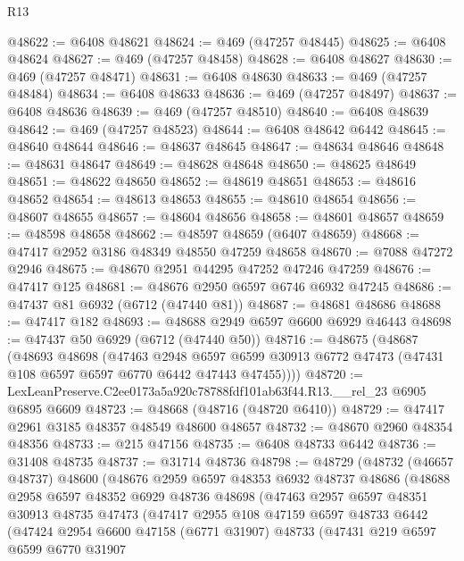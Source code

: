 \begin{lexlean}{R13}
\begin{coremodule}
@48622 := @6408 @48621
@48624 := @469 (@47257 @48445)
@48625 := @6408 @48624
@48627 := @469 (@47257 @48458)
@48628 := @6408 @48627
@48630 := @469 (@47257 @48471)
@48631 := @6408 @48630
@48633 := @469 (@47257 @48484)
@48634 := @6408 @48633
@48636 := @469 (@47257 @48497)
@48637 := @6408 @48636
@48639 := @469 (@47257 @48510)
@48640 := @6408 @48639
@48642 := @469 (@47257 @48523)
@48644 := @6408 @48642 @6442
@48645 := @48640 @48644
@48646 := @48637 @48645
@48647 := @48634 @48646
@48648 := @48631 @48647
@48649 := @48628 @48648
@48650 := @48625 @48649
@48651 := @48622 @48650
@48652 := @48619 @48651
@48653 := @48616 @48652
@48654 := @48613 @48653
@48655 := @48610 @48654
@48656 := @48607 @48655
@48657 := @48604 @48656
@48658 := @48601 @48657
@48659 := @48598 @48658
@48662 := @48597 @48659 (@6407 @48659)
@48668 := @47417 @2952 @3186 @48349 @48550 @47259 @48658
@48670 := @7088 @47272 @2946
@48675 := @48670 @2951 @44295 @47252 @47246 @47259
@48676 := @47417 @125
@48681 := @48676 @2950 @6597 @6746 @6932 @47245
@48686 := @47437 @81 @6932 (@6712 (@47440 @81))
@48687 := @48681 @48686
@48688 := @47417 @182
@48693 := @48688 @2949 @6597 @6600 @6929 @46443
@48698 := @47437 @50 @6929 (@6712 (@47440 @50))
@48716 := @48675
    (@48687
      (@48693
        @48698
        (@47463
          @2948
          @6597
          @6599
          @30913
          @6772
          @47473
          (@47431 @108 @6597 @6597 @6770 @6442 @47443 @47455))))
@48720 := LexLeanPreserve.C2ee0173a5a920c78788fdf101ab63f44.R13.__rel_23 @6905 @6895 @6609
@48723 := @48668 (@48716 (@48720 @6410))
@48729 := @47417 @2961 @3185 @48357 @48549 @48600 @48657
@48732 := @48670 @2960 @48354 @48356
@48733 := @215 @47156
@48735 := @6408 @48733 @6442
@48736 := @31408 @48735
@48737 := @31714 @48736
@48798 := @48729
    (@48732
      (@46657 @48737)
      @48600
      (@48676
        @2959
        @6597
        @48353
        @6932
        @48737
        @48686
        (@48688
          @2958
          @6597
          @48352
          @6929
          @48736
          @48698
          (@47463
            @2957
            @6597
            @48351
            @30913
            @48735
            @47473
            (@47417
              @2955
              @108
              @47159
              @6597
              @48733
              @6442
              (@47424
                @2954
                @6600
                @47158
                (@6771 @31907)
                @48733
                (@47431
                  @219
                  @6597
                  @6599
                  @6770
                  @31907

\end{coremodule}
\end{lexlean}
